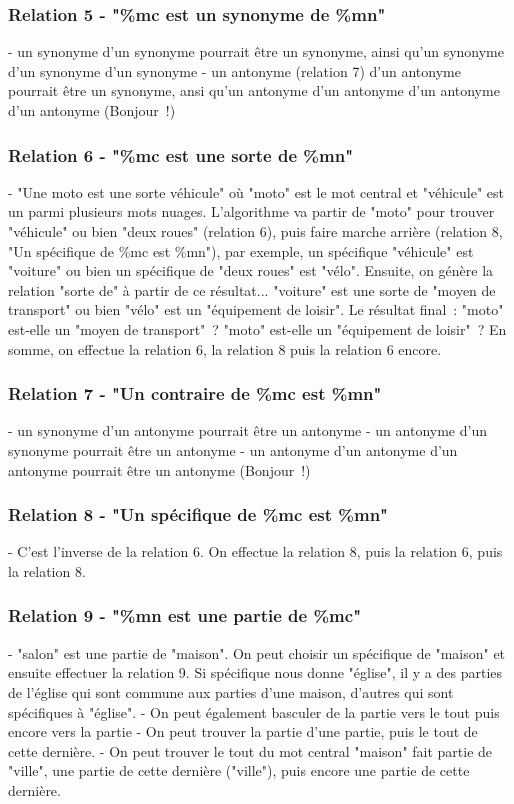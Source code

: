 \documentclass[a4paper,11pt,french]{article}
\begin{document}
\subsubsection{Relation 5 - "\%mc est un synonyme de \%mn"}

- un synonyme d'un synonyme pourrait être un synonyme, ainsi qu'un synonyme d'un synonyme d'un synonyme
- un antonyme (relation 7) d'un antonyme pourrait être un synonyme, ansi qu'un antonyme d'un antonyme d'un antonyme  d'un antonyme (Bonjour~!) 

\subsubsection{Relation 6 - "\%mc est une sorte de \%mn"}
- "Une moto est une sorte véhicule" où "moto" est le mot central et "véhicule" est un parmi plusieurs mots nuages. L'algorithme va partir de "moto" pour trouver "véhicule" ou bien "deux roues" (relation 6), puis faire marche arrière (relation 8, "Un spécifique de \%mc est \%mn"), par exemple, un spécifique "véhicule" est "voiture" ou bien un spécifique de "deux roues" est "vélo". Ensuite, on génère la relation "sorte de" à partir de ce résultat... "voiture" est une sorte de "moyen de transport" ou bien "vélo" est un "équipement de loisir". Le résultat final~: "moto" est-elle un "moyen de transport"~? "moto" est-elle un "équipement de loisir"~? 
En somme, on effectue la relation 6, la relation 8 puis la relation 6 encore.  

\subsubsection{Relation 7 - "Un contraire de \%mc est \%mn"}
- un synonyme d'un antonyme pourrait être un antonyme
- un antonyme d'un synonyme pourrait être un antonyme
- un antonyme d'un antonyme d'un antonyme pourrait être un antonyme (Bonjour~!)


\subsubsection{Relation 8 - "Un spécifique de \%mc est \%mn"}

- C'est l'inverse de la relation 6. On effectue la relation 8, puis la relation 6, puis la relation 8.


\subsubsection{Relation 9 -  "\%mn est une partie de \%mc"}
- "salon" est une partie de "maison". On peut choisir un spécifique de "maison" et ensuite effectuer la relation 9. Si spécifique nous donne "église", il y a des parties de l'église qui sont commune aux parties d'une maison, d'autres qui sont spécifiques à "église".
- On peut également basculer de la partie vers le tout puis encore vers la partie
- On peut trouver la partie d'une partie, puis le tout de cette dernière.
- On peut trouver le tout du mot central "maison" fait partie de "ville", une partie de cette dernière ("ville"), puis encore une partie de cette dernière.  
\end{document}

